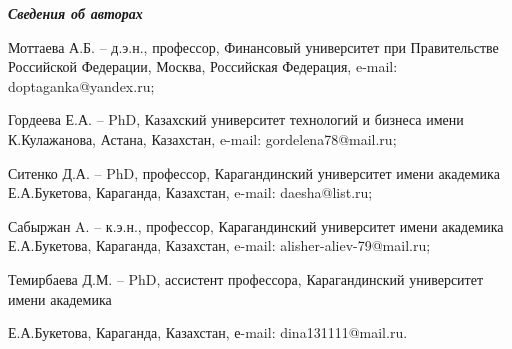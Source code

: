 \emph{{\bfseries Сведения об авторах}}

\begin{noparindent}
Моттаева А.Б. -- д.э.н., профессор, Финансовый университет при
Правительстве Российской Федерации, Москва, Российская Федерация,
e-mail: doptaganka@yandex.ru;

Гордеева Е.А. -- PhD, Казахский университет технологий и бизнеса имени
К.Кулажанова, Астана, Казахстан, e-mail: gordelena78@mail.ru;

Ситенко Д.А. -- PhD, профессор, Карагандинский университет имени
академика Е.А.Букетова, Караганда, Казахстан, e-mail: daesha@list.ru;

Сабыржан A. -- к.э.н., профессор, Карагандинский университет имени
академика Е.А.Букетова, Караганда, Казахстан, e-mail:
alisher-aliev-79@mail.ru;

Темирбаева Д.М. -- PhD, ассистент профессора, Карагандинский университет
имени академика

Е.А.Букетова, Караганда, Казахстан, е-mail:
dina131111@mail.ru.
\end{noparindent}
